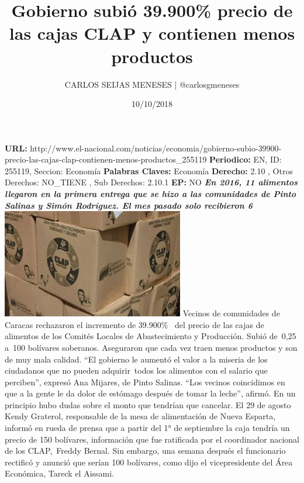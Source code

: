 \documentclass{article}%
\title{\textbf{Gobierno subió 39.900\% precio de las cajas CLAP y contienen menos productos}}%
\author{CARLOS SEIJAS MENESES | @carlosgmeneses}%
\date{10/10/2018}%
\begin{document}
%
\normalsize%
\maketitle%
\textbf{URL: }%
http://www.el{-}nacional.com/noticias/economia/gobierno{-}subio{-}39900{-}precio{-}las{-}cajas{-}clap{-}contienen{-}menos{-}productos\_255119\newline%
%
\textbf{Periodico: }%
EN, %
ID: %
255119, %
Seccion: %
Economía\newline%
%
\textbf{Palabras Claves: }%
Economía\newline%
%
\textbf{Derecho: }%
2.10%
, Otros Derechos: %
NO\_TIENE%
, Sub Derechos: %
2.10.1%
\newline%
%
\textbf{EP: }%
NO\newline%
\newline%
%
\textbf{\textit{En 2016, 11 alimentos llegaron en la primera entrega que se hizo a las comunidades de Pinto Salinas y Simón Rodríguez. El mes pasado solo recibieron 6}}%
\newline%
\newline%
%
\includegraphics[width=300px]{240.jpg}%
\newline%
%
Vecinos de comunidades de Caracas rechazaron el incremento de 39.900\% ~del precio de las cajas de alimentos de los Comités Locales de Abastecimiento y Producción. Subió de~0,25 a~100 bolívares soberanos. Aseguraron que cada vez traen menos productos y son de muy mala calidad. “El gobierno le aumentó el valor a la miseria de los ciudadanos que no pueden adquirir~todos los alimentos con el salario que perciben”, expresó Ana Mijares, de Pinto Salinas. “Los vecinos coincidimos en que a la gente le da dolor de estómago después de tomar la leche”, afirmó.%
\newline%
%
En un principio hubo dudas sobre el monto que tendrían que cancelar. El 29 de agosto Kendy Graterol, responsable de la mesa de alimentación de Nueva Esparta, informó en rueda de prensa que a partir del 1° de septiembre la caja tendría un precio de 150 bolívares, información que fue ratificada por el coordinador nacional de los CLAP,~Freddy Bernal. Sin embargo, una semana después el funcionario rectificó y anunció que serían 100 bolívares, como dijo el vicepresidente del Área Económica, Tareck el Aissami.%
\end{document}
